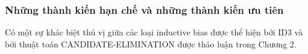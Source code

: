 \subsubsection{Những thành kiến ​​hạn chế và những thành kiến ​​ưu tiên}

Có một sự khác biệt thú vị giữa các loại inductive bias được thể hiện bởi ID3 và bởi thuật toán CANDIDATE-ELIMINATION được thảo luận trong Chương 2.

